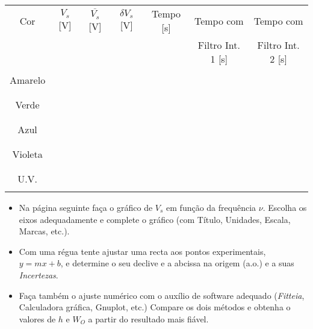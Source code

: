 \documentclass[a4paper,12pt]{article}  %
\begin{document}
\begin{center}
	\begin{tabular}{|c|c|c|c|c|c|c|}
	\hline
	Cor  & $V_s$ [V] & $\overline{V_s}$ [V]	& $\delta V_s$ [V] & Tempo [s] & Tempo com  & Tempo com\\
	  & & & &  & Filtro Int. 1 [s] & Filtro Int. 2 [s]\\
	\hline
	 &  &  &  &  &  & \\ \cline{2-2}
	Amarelo &  & & &  & &  \\ \cline{2-2}
	 &  &  &  &  &  & \\ 
	\hline
	 &  &  &  &  &  & \\ \cline{2-2}
	Verde & & & &  & &\\ \cline{2-2}
	 &  &  &  &  &  & \\ 
	\hline
	 &  &  &  &  &  & \\ \cline{2-2}
	Azul & & & &  & &\\ \cline{2-2}
	 &  &  &  &  &  & \\ 
	\hline
	 &  &  &  &  &  & \\ \cline{2-2}
	Violeta & & & &  & & \\ \cline{2-2}
	 &  &  &  &  &  & \\ 
	\hline
	 &  &  &  &  &  & \\ \cline{2-2}
	U.V. & & & &  & & \\ \cline{2-2}
	 &  &  &  &  &  & \\ 
	\hline
 	\end{tabular}
\end{center}

\begin{itemize}
\item  Na página seguinte faça o gráfico de $V_s$ em função da frequência $\nu$. Escolha os eixos adequadamente e complete o gráfico (com Título, Unidades, Escala, Marcas, etc.). 
\item Com uma régua tente  ajustar  uma recta aos pontos experimentais, $y=mx + b$, e determine o seu declive e a  abcissa na origem (a.o.) e a suas \emph{Incertezas}.
\item Faça também o ajuste numérico com o auxílio de software adequado (\emph{Fitteia}, Calculadora gráfica, Gnuplot, etc.) 
Compare os dois métodos e obtenha o valores de $h$ e $W_O$ a partir do resultado mais fiável.  
\end{itemize}
\end{document}

